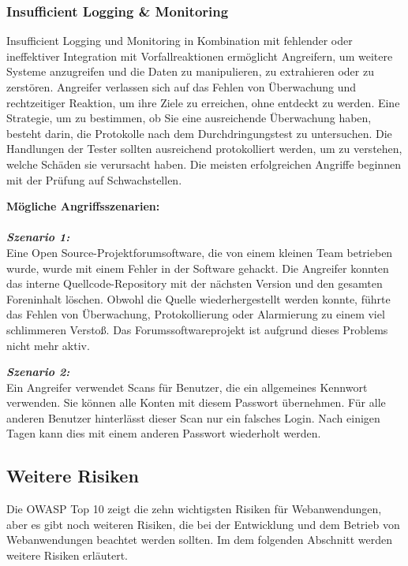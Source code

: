 \subsubsection{Insufficient Logging \& Monitoring}

Insufficient Logging und Monitoring in Kombination mit fehlender oder ineffektiver Integration mit Vorfallreaktionen ermöglicht Angreifern, um weitere Systeme anzugreifen und die Daten zu manipulieren, zu extrahieren oder zu zerstören\cite[6]{owasp17top10}. Angreifer verlassen sich auf das Fehlen von Überwachung und rechtzeitiger Reaktion, um ihre Ziele zu erreichen, ohne entdeckt zu werden. Eine Strategie, um zu bestimmen, ob Sie eine ausreichende Überwachung haben, besteht darin, die Protokolle nach dem Durchdringungstest zu untersuchen. Die Handlungen der Tester sollten ausreichend protokolliert werden, um zu verstehen, welche Schäden sie verursacht haben. Die meisten erfolgreichen Angriffe beginnen mit der Prüfung auf Schwachstellen\cite[16]{owasp17top10}.

\textbf{Mögliche Angriffsszenarien:}\\
\\
\textbf{\textit{Szenario 1:}}\\
Eine Open Source-Projektforumsoftware, die von einem kleinen Team betrieben wurde, wurde mit einem Fehler in der Software gehackt. Die Angreifer konnten das interne Quellcode-Repository mit der nächsten Version und den gesamten Foreninhalt löschen. Obwohl die Quelle wiederhergestellt werden konnte, führte das Fehlen von Überwachung, Protokollierung oder Alarmierung zu einem viel schlimmeren Verstoß. Das Forumssoftwareprojekt ist aufgrund dieses Problems nicht mehr aktiv\cite[16]{owasp17top10}.

\textbf{\textit{Szenario 2:}}\\
Ein Angreifer verwendet Scans für Benutzer, die ein allgemeines Kennwort verwenden. Sie können alle Konten mit diesem Passwort übernehmen. Für alle anderen Benutzer hinterlässt dieser Scan nur ein falsches Login. Nach einigen Tagen kann dies mit einem anderen Passwort wiederholt werden\cite[16]{owasp17top10}.

\subsection{Weitere Risiken}

Die OWASP Top 10 zeigt die zehn wichtigsten Risiken für Webanwendungen, aber es gibt noch weiteren Risiken, die bei der Entwicklung und dem Betrieb von Webanwendungen beachtet werden sollten. Im dem folgenden Abschnitt werden weitere Risiken erläutert.

